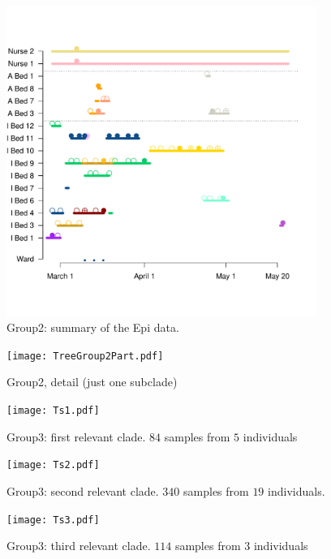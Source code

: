 \documentclass[12pt,a4paper]{article}
\begin{document}
\begin{figure}[!ht]
  \centering
    
      \includegraphics[width=0.9\textwidth]{Group2_Beds_2.pdf}
  \caption{Group2: summary of the Epi data.}\label{Group2Bed}
\end{figure}



\begin{figure}[!ht]
  \centering
   
      \texttt{[image: TreeGroup2Part.pdf]}
  \caption{Group2, detail (just one subclade)}\label{Group2TreePart}
\end{figure}
\begin{figure}[!ht]
  \centering
    
      \texttt{[image: Ts1.pdf]}
  \caption{Group3: first relevant clade. $84$ samples from $5$ individuals}\label{Group4Tree}
\end{figure}
\begin{figure}[!ht]
  \centering
    
      \texttt{[image: Ts2.pdf]}
  \caption{Group3: second relevant clade.  $340$ samples from $19$ individuals.}\label{Group4Tree}
\end{figure}
\begin{figure}[!ht]
  \centering
    
      \texttt{[image: Ts3.pdf]}
  \caption{Group3: third relevant clade. $114$ samples from $3$ individuals}\label{Group4Tree}
\end{figure}
\end{document}
